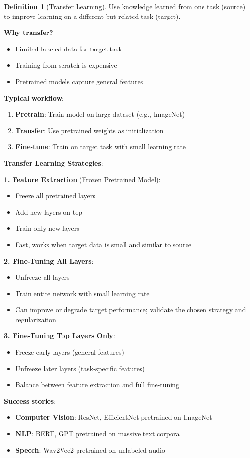 \documentclass[11pt,twoside]{article}
\numberwithin{equation}{section}
\theoremstyle{plain}
\theoremstyle{definition}
\newtheorem{definition}[theorem]{Definition}
\theoremstyle{remark}
\newenvironment{keyidea}{
  \begin{tcolorbox}[colback=yellow!5!white,
                    colframe=yellow!50!black,
                    title=Key Idea,
                    breakable,
                    enhanced,
                    sharp corners,
                    boxrule=0.8pt,
                    left=6pt, right=6pt, top=6pt, bottom=6pt]
}{
  \end{tcolorbox}
}
\begin{document}
\begin{definition}[Transfer Learning]
Use knowledge learned from one task (source) to improve learning on a different but related task (target).

\textbf{Why transfer?}
\begin{itemize}
\item Limited labeled data for target task
\item Training from scratch is expensive
\item Pretrained models capture general features
\end{itemize}

\textbf{Typical workflow}:
\begin{enumerate}
\item \textbf{Pretrain}: Train model on large dataset (e.g., ImageNet)
\item \textbf{Transfer}: Use pretrained weights as initialization
\item \textbf{Fine-tune}: Train on target task with small learning rate
\end{enumerate}
\end{definition}

\begin{keyidea}
\textbf{Transfer Learning Strategies}:

\textbf{1. Feature Extraction} (Frozen Pretrained Model):
\begin{itemize}
\item Freeze all pretrained layers
\item Add new layers on top
\item Train only new layers
\item Fast, works when target data is small and similar to source
\end{itemize}

\textbf{2. Fine-Tuning All Layers}:
\begin{itemize}
\item Unfreeze all layers
\item Train entire network with small learning rate
\item Can improve or degrade target performance; validate the chosen strategy and regularization
\end{itemize}

\textbf{3. Fine-Tuning Top Layers Only}:
\begin{itemize}
\item Freeze early layers (general features)
\item Unfreeze later layers (task-specific features)
\item Balance between feature extraction and full fine-tuning
\end{itemize}

\textbf{Success stories}:
\begin{itemize}
\item \textbf{Computer Vision}: ResNet, EfficientNet pretrained on ImageNet
\item \textbf{NLP}: BERT, GPT pretrained on massive text corpora
\item \textbf{Speech}: Wav2Vec2 pretrained on unlabeled audio
\end{itemize}
\end{keyidea}
\end{document}
